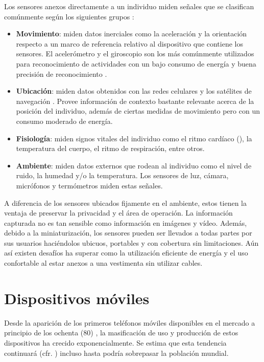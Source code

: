 Los sensores anexos directamente a un individuo miden señales que
se clasifican comúnmente según los siguientes grupos \cite{LaraLabrador2013}:
\begin{itemize}
\item \textbf{Movimiento}: miden datos inerciales como la aceleración y
la orientación respecto a un marco de referencia relativo al dispositivo
que contiene los sensores. El acelerómetro y el giroscopio son los
más comúnmente utilizados para reconocimiento de actividades con un
bajo consumo de energía y buena precisión de reconocimiento \cite{Bao2004,LaraLabrador2012}.
\item \textbf{Ubicación}: miden datos obtenidos con las redes celulares
 y los satélites de navegación . Provee información
de contexto bastante relevante acerca de la posición del individuo,
además de ciertas medidas de movimiento pero con un consumo moderado
de energía.
\item \textbf{Fisiología}: miden signos vitales del individuo como el ritmo
cardíaco (), la temperatura del cuerpo, el ritmo de respiración,
entre otros.
\item \textbf{Ambiente}: miden datos externos que rodean al individuo como
el nivel de ruido, la humedad y/o la temperatura. Los sensores de
luz, cámara, micrófonos y termómetros miden estas señales. 
\end{itemize}
A diferencia de los sensores ubicados fijamente en el ambiente, estos
tienen la ventaja de preservar la privacidad y el área de operación.
La información capturada no es tan sensible como información en imágenes
y vídeo. Además, debido a la miniaturización, los sensores pueden
ser llevados a todas partes por sus usuarios haciéndolos ubicuos,
portables y con cobertura sin limitaciones. Aún así existen desafíos
ha superar como la utilización eficiente de energía y el uso confortable
al estar anexos a una vestimenta sin utilizar cables.

\section{Dispositivos móviles}

\label{sec24:dispositivos-moviles} Desde la aparición de los primeros
teléfonos móviles disponibles en el mercado a principio de los ochenta
(80) \cite{Tanenbaum2010}, la masificación de uso y producción de
estos dispositivos ha crecido exponencialmente. Se estima que esta
tendencia continuará (cfr. \cite{Ekholm2011}) incluso hasta podría
sobrepasar la población mundial.

